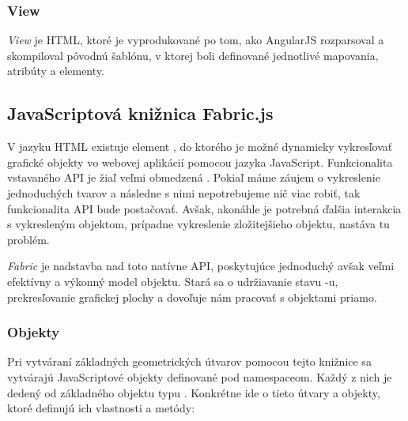 \subsubsection{View}
\textit{View} je HTML, ktoré je vyprodukované po tom, ako AngularJS rozparsoval a skompiloval pôvodnú šablónu, v ktorej boli definované jednotlivé mapovania, atribúty a elementy.

\subsection{JavaScriptová knižnica Fabric.js}\label{sec:fabric}

V jazyku HTML existuje element , do ktorého je možné dynamicky vykresľovať grafické objekty vo webovej aplikácií pomocou jazyka JavaScript. Funkcionalita vstavaného API je žiaľ veľmi obmedzená \cite{cabanier2014html}. Pokiaľ máme záujem o vykreslenie jednoduchých tvarov a následne s nimi nepotrebujeme nič viac robiť, tak funkcionalita API bude postačovať. Avšak, akonáhle je potrebná ďalšia interakcia s vykresleným objektom, prípadne vykreslenie zložitejšieho objektu, nastáva tu problém.

\textit{Fabric} je nadstavba nad toto natívne API, poskytujúce jednoduchý avšak veľmi efektívny a výkonný model objektu. Stará sa o udržiavanie stavu -u, prekresľovanie grafickej plochy a dovoľuje nám pracovať s objektami priamo.

\subsubsection{Objekty}

Pri vytváraní základných geometrických útvarov pomocou tejto knižnice sa vytvárajú JavaScriptové objekty definované pod  namespaceom. Každý z nich je dedený od základného  objektu typu . Konkrétne ide o tieto útvary a objekty, ktoré definujú ich vlastnosti a metódy:

